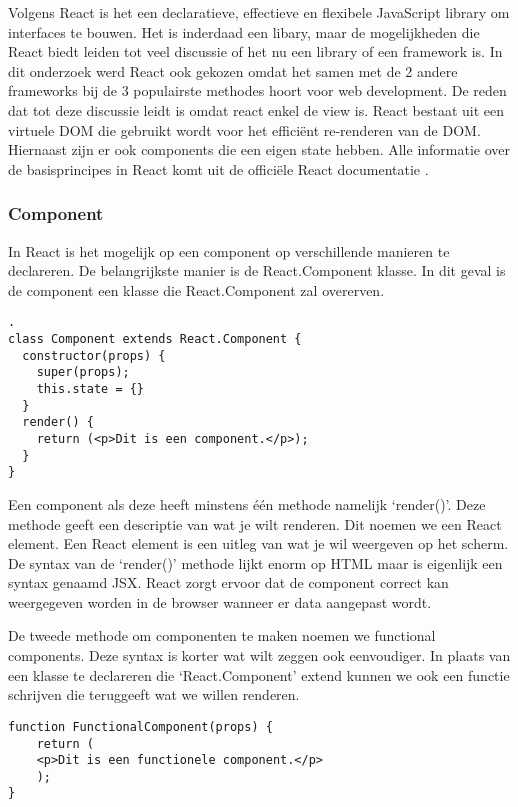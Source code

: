 Volgens React is het een declaratieve, effectieve en flexibele JavaScript library om interfaces te bouwen. Het is inderdaad een libary, maar de mogelijkheden die React biedt leiden tot veel discussie of het nu een library of een framework is. In dit onderzoek werd React ook gekozen omdat het samen met de 2 andere frameworks bij de 3 populairste methodes hoort voor web development. De reden dat tot deze discussie leidt is omdat react enkel de view is. React bestaat uit een virtuele DOM die gebruikt wordt voor het efficiënt re-renderen van de DOM. Hiernaast zijn er ook components die een eigen state hebben.
Alle informatie over de basisprincipes in React komt uit de officiële React documentatie \autocite{_react_2018}.

\subsubsection{Component}
\label{sec:React_Component}
In React is het mogelijk op een component op verschillende manieren te declareren. De belangrijkste manier is de React.Component klasse. In dit geval is de component een klasse die React.Component zal overerven.

\begin{verbatim}.
class Component extends React.Component {
  constructor(props) {
    super(props);
    this.state = {}
  }  
  render() {
    return (<p>Dit is een component.</p>);
  }
}
\end{verbatim}

Een component als deze heeft minstens één methode namelijk ‘render()’. Deze methode geeft een descriptie van wat je wilt renderen. Dit noemen we een React element. Een React element is een uitleg van wat je wil weergeven op het scherm. De syntax van de ‘render()’ methode lijkt enorm op HTML maar is eigenlijk een syntax genaamd JSX. React zorgt ervoor dat de component correct kan weergegeven worden in de browser wanneer er data aangepast wordt.

De tweede methode om componenten te maken noemen we functional components. Deze syntax is korter wat wilt zeggen ook eenvoudiger. In plaats van een klasse te declareren die ‘React.Component’ extend kunnen we ook een functie schrijven die teruggeeft wat we willen renderen.

\begin{verbatim}
function FunctionalComponent(props) {
	return (
	<p>Dit is een functionele component.</p>
	);
}
\end{verbatim}

